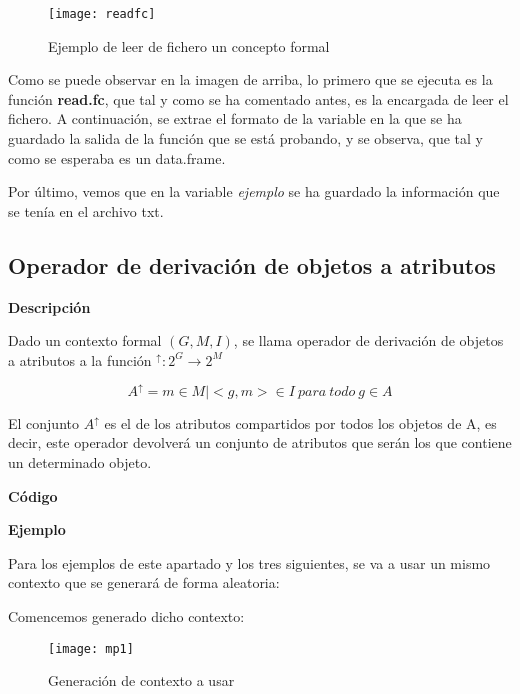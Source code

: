         \begin{figure}[H]
            \centering
            \texttt{[image: readfc]}
            \caption{Ejemplo de leer de fichero un concepto formal}
            \label{fig:readfc}
        \end{figure}

        Como se puede observar en la imagen de arriba, lo primero que se ejecuta es la funci\'on \textbf{read.fc}, que tal y como se ha comentado 
        antes, es la encargada de leer el fichero. A continuaci\'on, se extrae el formato de la variable en la que se ha guardado la 
        salida de la funci\'on que se est\'a probando, y se observa, que tal y como se esperaba es un data.frame.

        Por \'ultimo, vemos que en la variable \textit{ejemplo} se ha guardado la informaci\'on que se ten\'ia en el archivo txt.

    \subsection{Operador de derivaci\'on de objetos a atributos}

        \textbf{Descripci\'on}

        Dado un contexto formal \( (G, M, I) \), se llama operador de derivaci\'on de objetos a atributos a la 
        funci\'on \( ^\uparrow : 2^G \rightarrow 2^M \)

        \[ A^\uparrow = { m \in M | <g,m> \in I ~ para ~ todo ~ g \in A } \]

        El conjunto \( A^\uparrow \) es el de los atributos compartidos por todos los objetos de A, es decir, este operador devolver\'a 
        un conjunto de atributos que ser\'an los que contiene un determinado objeto.
        
        \bigskip


        \textbf{C\'odigo}

        

        \textbf{Ejemplo}

        Para los ejemplos de este apartado y los tres siguientes, se va a usar un mismo contexto que se generar\'a de forma aleatoria:

        Comencemos generado dicho contexto:

        \begin{figure}[H]
            \centering
            \texttt{[image: mp1]}
            \caption{Generaci\'on de contexto a usar}
            \label{fig:mp1}
        \end{figure}


